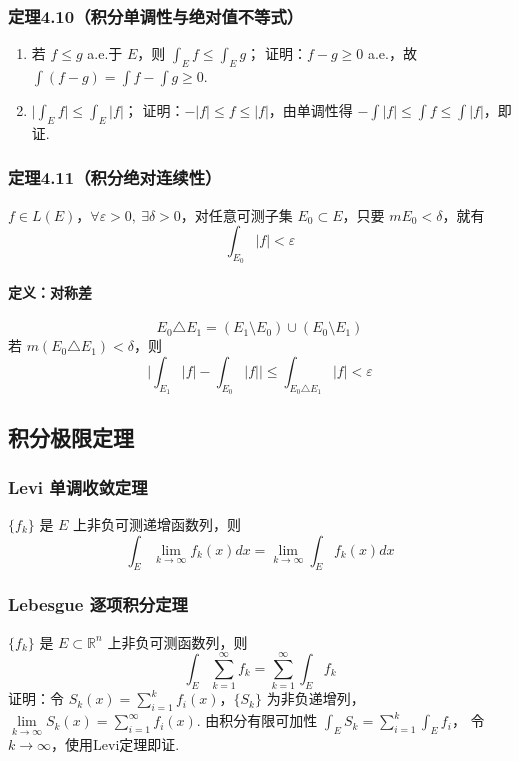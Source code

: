 \documentclass{article}
\begin{document}
	\subsubsection{定理4.10（积分单调性与绝对值不等式）}
	\begin{enumerate}
		\item 若 $f\le g$ a.e.于 $E$，则 $\displaystyle \int_E f \le \int_E g$；
		证明：$f-g\ge 0$ a.e.，故 $\displaystyle \int (f-g) = \int f - \int g \ge 0$.
		\item $\displaystyle \Big|\int_E f\Big| \le \int_E |f|$；
		证明：$-|f|\le f \le |f|$，由单调性得 $-\int|f|\le \int f \le \int|f|$，即证.
	\end{enumerate}
	
	\subsubsection{定理4.11（积分绝对连续性）}
	$f\in L(E)$，$\forall \varepsilon>0,\ \exists \delta>0$，对任意可测子集 $E_0\subset E$，只要 $mE_0<\delta$，就有
	\[
	\displaystyle \int_{E_0}|f| < \varepsilon
	\]
	
	\paragraph{定义：对称差}
	\[
	E_0 \triangle E_1 = (E_1\setminus E_0) \cup (E_0\setminus E_1)
	\]
	若 $m(E_0\triangle E_1)<\delta$，则
	\[
	\displaystyle \Big|\int_{E_1}|f| - \int_{E_0}|f|\Big|
	\le \int_{E_0\triangle E_1}|f| < \varepsilon
	\]
	
	\subsection{积分极限定理}
	\subsubsection{Levi 单调收敛定理}
	$\{f_k\}$ 是 $E$ 上非负可测递增函数列，则
	\[
	\displaystyle \int_E \lim_{k\to\infty} f_k(x) dx
	= \lim_{k\to\infty} \int_E f_k(x) dx
	\]
	
	\subsubsection{Lebesgue 逐项积分定理}
	$\{f_k\}$ 是 $E\subset\mathbb{R}^n$ 上非负可测函数列，则
	\[
	\displaystyle \int_E \sum_{k=1}^\infty f_k
	= \sum_{k=1}^\infty \int_E f_k
	\]
	证明：令 $\displaystyle S_k(x) = \sum_{i=1}^k f_i(x)$，$\{S_k\}$ 为非负递增列，
	$\lim\limits_{k\to\infty}S_k(x) = \sum\limits_{i=1}^\infty f_i(x)$.
	由积分有限可加性 $\displaystyle \int_E S_k = \sum_{i=1}^k \int_E f_i$，
	令 $k\to\infty$，使用Levi定理即证.
	
\end{document}
